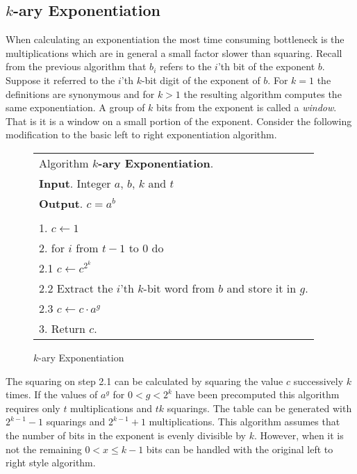 \documentclass[b5paper]{book}
\begin{document}
\subsection{$k$-ary Exponentiation}
When calculating an exponentiation the most time consuming bottleneck is the multiplications which are in general a small factor
slower than squaring.  Recall from the previous algorithm that $b_{i}$ refers to the $i$'th bit of the exponent $b$.  Suppose it referred to
the $i$'th $k$-bit digit of the exponent of $b$.  For $k = 1$ the definitions are synonymous and for $k > 1$ the resulting algorithm
computes the same exponentiation.  A group of $k$ bits from the exponent is called a \textit{window}.  That is it is a window on a small
portion of the exponent.  Consider the following modification to the basic left to right exponentiation algorithm.

\newpage\begin{figure}[!here]
\begin{small}
\begin{center}
\begin{tabular}{l}
\hline Algorithm \textbf{$k$-ary Exponentiation}. \\
\textbf{Input}.   Integer $a$, $b$, $k$ and $t$ \\
\textbf{Output}.  $c = a^b$ \\
\hline \\
1.  $c \leftarrow 1$ \\
2.  for $i$ from $t - 1$ to $0$ do \\
\hspace{3mm}2.1  $c \leftarrow c^{2^k} $ \\
\hspace{3mm}2.2  Extract the $i$'th $k$-bit word from $b$ and store it in $g$. \\
\hspace{3mm}2.3  $c \leftarrow c \cdot a^g$ \\
3.  Return $c$. \\
\hline
\end{tabular}
\end{center}
\end{small}
\caption{$k$-ary Exponentiation}
\end{figure}

The squaring on step 2.1 can be calculated by squaring the value $c$ successively $k$ times.  If the values of $a^g$ for $0 < g < 2^k$ have been
precomputed this algorithm requires only $t$ multiplications and $tk$ squarings.  The table can be generated with $2^{k - 1} - 1$ squarings and
$2^{k - 1} + 1$ multiplications.  This algorithm assumes that the number of bits in the exponent is evenly divisible by $k$.  
However, when it is not the remaining $0 < x \le k - 1$ bits can be handled with the original left to right style algorithm.
\end{document}
